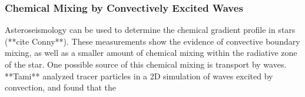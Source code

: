 {\color{purple}
\subsubsection{Chemical Mixing by Convectively Excited Waves}
}

Asteroseismology can be used to determine the chemical gradient profile in stars (**cite Conny**). These measurements show the evidence of convective boundary mixing, as well as a smaller amount of chemical mixing within the radiative zone of the star. One possible source of this chemical mixing is transport by waves. **Tami** analyzed tracer particles in a 2D simulation of waves excited by convection, and found that the 

